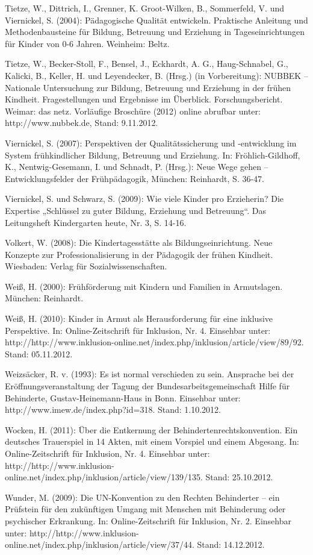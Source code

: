 Tietze, W., Dittrich, I., Grenner, K. Groot-Wilken, B., Sommerfeld, V. und Viernickel, S. (2004): Pädagogische Qualität entwickeln. Praktische Anleitung und Methodenbausteine für Bildung, Betreuung und Erziehung in Tageseinrichtungen für Kinder von 0-6 Jahren. Weinheim: Beltz.

Tietze, W., Becker-Stoll, F., Bensel, J., Eckhardt, A. G., Haug-Schnabel, G., Kalicki, B., Keller, H. und Leyendecker, B. (Hrsg.) (in Vorbereitung): NUBBEK -- Nationale Untersuchung zur Bildung, Betreuung und Erziehung in der frühen Kindheit.
Fragestellungen und Ergebnisse im Überblick. Forschungsbericht. Weimar: das netz. Vorläufige Broschüre (2012) online abrufbar unter: http://www.nubbek.de, Stand:  9.11.2012.

Viernickel, S. (2007): Perspektiven der Qualitätssicherung und -entwicklung im System frühkindlicher Bildung, Betreuung und Erziehung. In: Fröhlich-Gildhoff, K., Nentwig-Gesemann, I. und Schnadt, P. (Hrsg.): Neue Wege gehen -- Entwicklungsfelder der Frühpädagogik,  München: Reinhardt, S. 36-47. 

Viernickel, S. und Schwarz, S. (2009): Wie viele Kinder pro Erzieherin? Die Expertise „Schlüssel zu guter Bildung, Erziehung und Betreuung“. Das Leitungsheft Kindergarten heute, Nr. 3, S. 14-16.

Volkert, W. (2008): Die Kindertagesstätte als Bildungseinrichtung. Neue Konzepte zur Professionalisierung in der Pädagogik der frühen Kindheit. Wiesbaden: Verlag für Sozialwissenschaften.

Weiß, H. (2000): Frühförderung mit Kindern und Familien in Armutslagen. München: Reinhardt.

Weiß, H. (2010): Kinder in Armut als Herausforderung für eine inklusive Perspektive. In: Online-Zeitschrift für Inklusion, Nr. 4. Einsehbar unter: http://http://www.inklusion-online.net/index.php/inklusion/article/view/89/92. Stand: 05.11.2012.

Weizsäcker, R. v. (1993): Es ist normal verschieden zu sein. Ansprache bei der Eröffnungsveranstaltung der Tagung der Bundesarbeitsgemeinschaft Hilfe für Behinderte, Gustav-Heinemann-Haus in Bonn. Einsehbar unter: http://www.imew.de/index.php?id=318. Stand: 1.10.2012.


Wocken, H. (2011): Über die Entkernung der Behindertenrechtskonvention.
Ein deutsches Trauerspiel in 14 Akten, mit einem Vorspiel und einem Abgesang. In: Online-Zeitschrift für Inklusion, Nr. 4. Einsehbar unter: http://http://www.inklusion-online.net/index.php/inklusion/article/view/139/135. Stand: 25.10.2012. 

Wunder, M. (2009): Die UN-Konvention zu den Rechten Behinderter – ein Prüfstein für den zukünftigen Umgang mit Menschen mit Behinderung oder psychischer Erkrankung. In: Online-Zeitschrift für Inklusion, Nr. 2. Einsehbar unter: http://http://www.inklusion-online.net/index.php/inklusion/article/view/37/44. Stand: 14.12.2012.  
